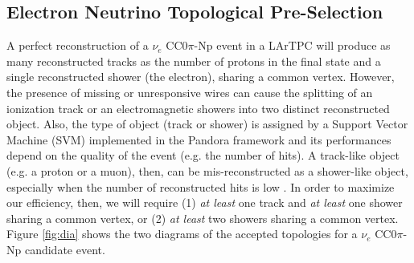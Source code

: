 \subsection{Electron Neutrino Topological Pre-Selection} \label{sec:topological_pre_selection}
A perfect reconstruction of a $\nu_{e}$ CC0$\pi$-Np event in a LArTPC will produce as many reconstructed tracks as the number of protons in the final state and a single reconstructed shower (the electron), sharing a common vertex. However, the presence of missing or unresponsive wires can cause the splitting of an ionization track or an electromagnetic showers into two distinct reconstructed object. Also, the type of object (track or shower) is assigned by a Support Vector Machine (SVM) implemented in the Pandora framework and its performances depend on the quality of the event (e.g. the number of hits). A track-like object (e.g. a proton or a muon), then, can be mis-reconstructed as a shower-like object, especially when the number of reconstructed hits is low \cite{pandora2}. In order to maximize our efficiency, then, we will require (1) \emph{at least} one track and \emph{at least} one shower sharing a common vertex, or (2) \emph{at least} two showers sharing a common vertex. Figure \ref{fig:dia} shows the two diagrams of the accepted topologies for a $\nu_{e}$ CC0$\pi$-Np candidate event.


